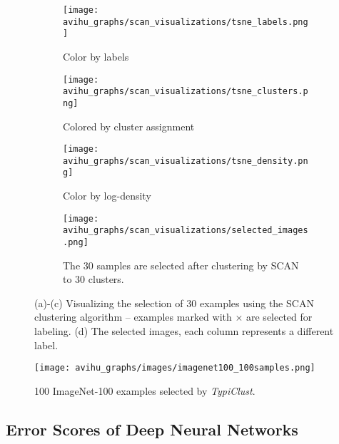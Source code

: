 \documentclass{article}
\begin{document}
\begin{figure*}[thb!]
\begin{center}
    \begin{subfigure}{.27\textwidth}
      \centering
      \texttt{[image: avihu\_graphs/scan\_visualizations/tsne\_labels.png]}
      \caption{Color by labels}
      \label{subfig:tsne_labels}
    \end{subfigure}
    \begin{subfigure}{.27\textwidth}
      \centering
      \texttt{[image: avihu\_graphs/scan\_visualizations/tsne\_clusters.png]}
      \caption{Colored by cluster assignment}
      \label{subfig:tsne_clusters}
    \end{subfigure}
    \begin{subfigure}{.27\textwidth}
      \centering
      \texttt{[image: avihu\_graphs/scan\_visualizations/tsne\_density.png]}
      \caption{Color by log-density}
      \label{subfig:tsne_density}
    \end{subfigure}
    \begin{center}
    \begin{subfigure}{.55\textwidth}
      \centering
      \texttt{[image: avihu\_graphs/scan\_visualizations/selected\_images.png]}
      \caption{The $30$ samples are selected after clustering by SCAN to $30$ clusters.}
      \label{subfig:30_images_scan}
    \end{subfigure}
    \end{center}
    \caption{(a)-(c) Visualizing the selection of $30$ examples using the SCAN clustering algorithm -- examples marked with $\boldsymbol{\times}$ are selected for labeling. (d) The selected images, each column represents a different label.}
    \label{fig:tsne}
\end{center}
\vspace{-0.6cm}
\end{figure*}

\begin{figure}[thb!]
\begin{center}
      \texttt{[image: avihu\_graphs/images/imagenet100\_100samples.png]}
    \caption{100 ImageNet-100 examples selected by \emph{TypiClust}. }
    \label{fig:imagenet_images}
\end{center}
\end{figure}




\subsection{Error Scores of Deep Neural Networks}
\label{sec:error-dnn}
\end{document}
